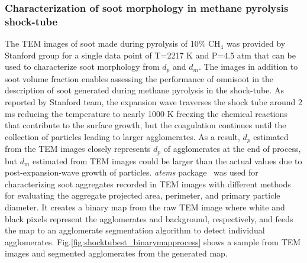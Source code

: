 %
%

\subsubsection{Characterization of soot morphology in methane pyrolysis shock-tube}

The TEM images of soot made during pyrolysis of 10\% $\mathrm{CH_4}$ was provided by Stanford group for a single data point of T=2217 K and P=4.5 atm that can be used to characterize soot morphology from ${d_p}$ and ${d_m}$. The images in addition to soot volume fraction enables assessing the performance of omnisoot in the description of soot generated during methane pyrolysis in the shock-tube. As reported by Stanford team, the expansion wave traverses the shock tube around 2 ms reducing the temperature to nearly 1000 K freezing the chemical reactions that contribute to the surface growth, but the coagulation continues until the collection of particles leading to larger agglomerates. As a result, $d_p$ estimated from the TEM images closely represents $d_p$ of agglomerates at the end of process, but $d_m$ estimated from TEM images could be larger than the actual values due to post-expansion-wave growth of particles. \textit{atems} package~\citep{sipkens2021using} was used for characterizing soot aggregates recorded in TEM images with different methods for evaluating the aggregate projected area, perimeter, and primary particle diameter. It creates a binary map from the raw TEM image where white and black pixels represent the agglomerates and background, respectively, and feeds the map to an agglomerate segmentation algorithm to detect individual agglomerates. Fig.\ref{fig:shocktubest_binarymapprocess} shows a sample from TEM images and segmented agglomerates from the generated map.

